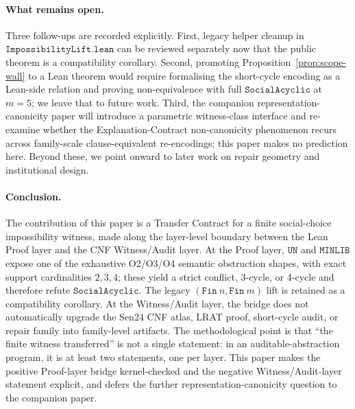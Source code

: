 \paragraph{What remains open.}
Three follow-ups are recorded explicitly.
First, legacy helper cleanup in \(\mathtt{ImpossibilityLift.lean}\) can be reviewed separately now that the public theorem is a compatibility corollary.
Second, promoting Proposition~\ref{prop:scope-wall} to a Lean theorem would require formalising the short-cycle encoding as a Lean-side relation and proving non-equivalence with full \(\mathtt{SocialAcyclic}\) at \(m = 5\); we leave that to future work.
Third, the companion representation-canonicity paper will introduce a parametric witness-class interface and re-examine whether the Explanation-Contract non-canonicity phenomenon recurs across family-scale clause-equivalent re-encodings; this paper makes no prediction here.
Beyond these, we point onward to later work on repair geometry and institutional design.

\paragraph{Conclusion.}
The contribution of this paper is a Transfer Contract for a finite social-choice impossibility witness, made along the layer-level boundary between the Lean Proof layer and the CNF Witness/Audit layer.
At the Proof layer, \(\mathtt{UN}\) and \(\mathtt{MINLIB}\) expose one of the exhaustive O2/O3/O4 semantic obstruction shapes, with exact support cardinalities \(2,3,4\); these yield a strict conflict, 3-cycle, or 4-cycle and therefore refute \(\mathtt{SocialAcyclic}\).
The legacy \((\mathtt{Fin}\ n,\mathtt{Fin}\ m)\) lift is retained as a compatibility corollary.
At the Witness/Audit layer, the bridge does not automatically upgrade the Sen24 CNF atlas, LRAT proof, short-cycle audit, or repair family into family-level artifacts.
The methodological point is that ``the finite witness transferred'' is not a single statement: in an auditable-abstraction program, it is at least two statements, one per layer.
This paper makes the positive Proof-layer bridge kernel-checked and the negative Witness/Audit-layer statement explicit, and defers the further representation-canonicity question to the companion paper.
